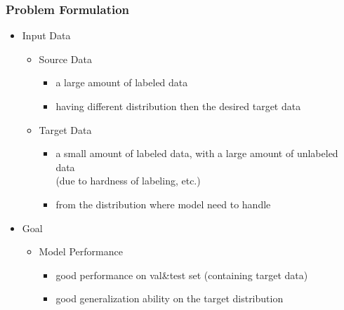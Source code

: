 \subsubsection{Problem Formulation}
\begin{itemize}
\item Input Data
	\begin{itemize}
	\item Source Data
		\begin{itemize}
		\item a large amount of labeled data
		\item having different distribution then the desired target data
		\end{itemize}
	\item Target Data
		\begin{itemize}
		\item a small amount of labeled data, with a large amount of unlabeled data \\
		(due to hardness of labeling, etc.)
		\item from the distribution where model need to handle
		\end{itemize}
	\end{itemize}
\item Goal
	\begin{itemize}
	\item Model Performance
		\begin{itemize}
		\item good performance on val\&test set (containing target data)
		\item good generalization ability on the target distribution
		\end{itemize}
	\end{itemize}
\end{itemize}
